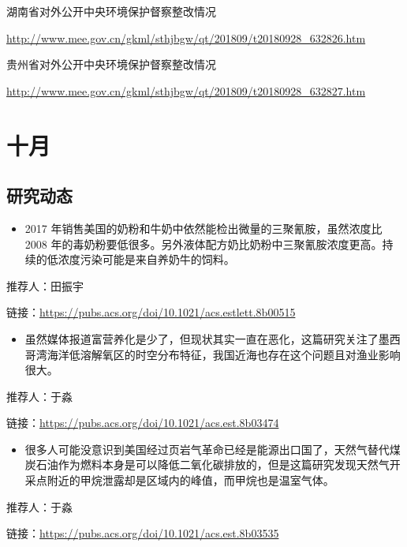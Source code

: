 \documentclass[]{book}
\providecommand{\tightlist}{%
  \setlength{\itemsep}{0pt}\setlength{\parskip}{0pt}}
\begin{document}
湖南省对外公开中央环境保护督察整改情况

\url{http://www.mee.gov.cn/gkml/sthjbgw/qt/201809/t20180928_632826.htm}

贵州省对外公开中央环境保护督察整改情况

\url{http://www.mee.gov.cn/gkml/sthjbgw/qt/201809/t20180928_632827.htm}

\hypertarget{ux5341ux6708}{%
\section*{十月}\label{ux5341ux6708}}

\hypertarget{ux7814ux7a76ux52a8ux6001-11}{%
\subsection*{研究动态}\label{ux7814ux7a76ux52a8ux6001-11}}

\begin{itemize}
\tightlist
\item
  2017 年销售美国的奶粉和牛奶中依然能检出微量的三聚氰胺，虽然浓度比 2008 年的毒奶粉要低很多。另外液体配方奶比奶粉中三聚氰胺浓度更高。持续的低浓度污染可能是来自养奶牛的饲料。
\end{itemize}

推荐人：田振宇

链接：\url{https://pubs.acs.org/doi/10.1021/acs.estlett.8b00515}

\begin{itemize}
\tightlist
\item
  虽然媒体报道富营养化是少了，但现状其实一直在恶化，这篇研究关注了墨西哥湾海洋低溶解氧区的时空分布特征，我国近海也存在这个问题且对渔业影响很大。
\end{itemize}

推荐人：于淼

链接：\url{https://pubs.acs.org/doi/10.1021/acs.est.8b03474}

\begin{itemize}
\tightlist
\item
  很多人可能没意识到美国经过页岩气革命已经是能源出口国了，天然气替代煤炭石油作为燃料本身是可以降低二氧化碳排放的，但是这篇研究发现天然气开采点附近的甲烷泄露却是区域内的峰值，而甲烷也是温室气体。
\end{itemize}

推荐人：于淼

链接：\url{https://pubs.acs.org/doi/10.1021/acs.est.8b03535}
\end{document}
